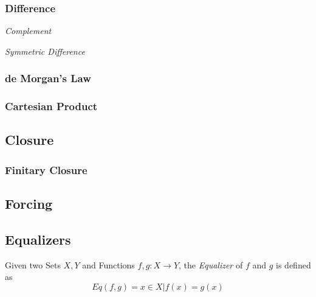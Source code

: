 \documentclass{article}
\begin{document}
\subsubsection{Difference}\label{subsec:set_difference}

\emph{Complement}

\emph{Symmetric Difference}



\subsubsection{de Morgan's Law}\label{subsec:de_morgan}

\subsubsection{Cartesian Product}\label{subsec:set_product}



\subsection{Closure}\label{subsec:set_closure}

\subsubsection{Finitary Closure}\label{subsec:finitary_closure}

\subsection{Forcing}\label{subsec:forcing}

\subsection{Equalizers}\label{subsec:set_equalizer}

Given two Sets $X,Y$ and Functions $f,g : X \rightarrow Y$, the
\emph{Equalizer} of $f$ and $g$ is defined as
\[
    Eq(f,g) = { x \in X | f(x) = g(x) }
\]
\end{document}
